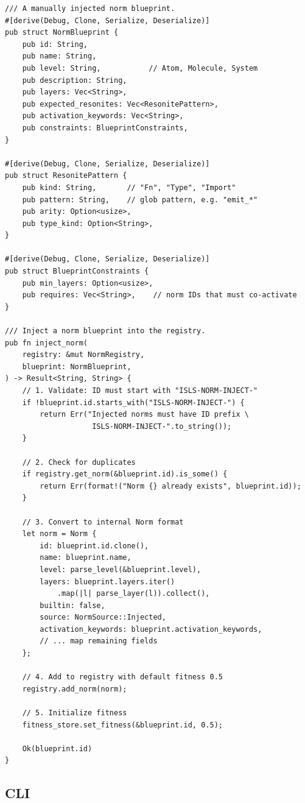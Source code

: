 \documentclass[11pt,a4paper]{article}
\begin{document}
\begin{lstlisting}[style=rust]
/// A manually injected norm blueprint.
#[derive(Debug, Clone, Serialize, Deserialize)]
pub struct NormBlueprint {
    pub id: String,
    pub name: String,
    pub level: String,           // Atom, Molecule, System
    pub description: String,
    pub layers: Vec<String>,
    pub expected_resonites: Vec<ResonitePattern>,
    pub activation_keywords: Vec<String>,
    pub constraints: BlueprintConstraints,
}

#[derive(Debug, Clone, Serialize, Deserialize)]
pub struct ResonitePattern {
    pub kind: String,       // "Fn", "Type", "Import"
    pub pattern: String,    // glob pattern, e.g. "emit_*"
    pub arity: Option<usize>,
    pub type_kind: Option<String>,
}

#[derive(Debug, Clone, Serialize, Deserialize)]
pub struct BlueprintConstraints {
    pub min_layers: Option<usize>,
    pub requires: Vec<String>,    // norm IDs that must co-activate
}

/// Inject a norm blueprint into the registry.
pub fn inject_norm(
    registry: &mut NormRegistry,
    blueprint: NormBlueprint,
) -> Result<String, String> {
    // 1. Validate: ID must start with "ISLS-NORM-INJECT-"
    if !blueprint.id.starts_with("ISLS-NORM-INJECT-") {
        return Err("Injected norms must have ID prefix \
                    ISLS-NORM-INJECT-".to_string());
    }
    
    // 2. Check for duplicates
    if registry.get_norm(&blueprint.id).is_some() {
        return Err(format!("Norm {} already exists", blueprint.id));
    }
    
    // 3. Convert to internal Norm format
    let norm = Norm {
        id: blueprint.id.clone(),
        name: blueprint.name,
        level: parse_level(&blueprint.level),
        layers: blueprint.layers.iter()
            .map(|l| parse_layer(l)).collect(),
        builtin: false,
        source: NormSource::Injected,
        activation_keywords: blueprint.activation_keywords,
        // ... map remaining fields
    };
    
    // 4. Add to registry with default fitness 0.5
    registry.add_norm(norm);
    
    // 5. Initialize fitness
    fitness_store.set_fitness(&blueprint.id, 0.5);
    
    Ok(blueprint.id)
}
\end{lstlisting}

\subsection{CLI}
\end{document}
